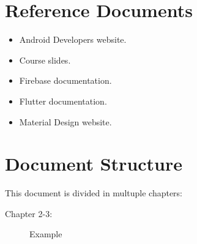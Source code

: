 \section{Reference Documents}
\begin{itemize}
    \item Android Developers website.
    \item Course slides.
    \item Firebase documentation.
    \item Flutter documentation.
    \item Material Design website. 
\end{itemize}

\section{Document Structure}
This document is divided in multuple chapters:
\begin{description}
    \item[Chapter 2-3:] Example
\end{description}